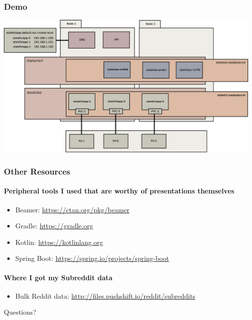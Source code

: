\documentclass{beamer}
\begin{document}
\begin{frame}
    \frametitle{Demo}
    \includegraphics[width=\textwidth,height=\textheight,keepaspectratio]{graphics/08-loadBalancer.eps}
\end{frame}

\begin{frame}
\frametitle{Other Resources}
\paragraph{Peripheral tools I used that are worthy of presentations themselves}
\begin{itemize}
    \item Beamer: \href{https://ctan.org/pkg/beamer}{https://ctan.org/pkg/beamer}
    \item Gradle: \href{https://gradle.org}{https://gradle.org}
    \item Kotlin: \href{https://kotlinlang.org}{https://kotlinlang.org}
    \item Spring Boot: \href{https://spring.io/projects/spring-boot}{https://spring.io/projects/spring-boot}
\end{itemize}
\paragraph{Where I got my Subreddit data}
\begin{itemize}
    \item Bulk Reddit data: \href{http://files.pushshift.io/reddit/subreddits}{http://files.pushshift.io/reddit/subreddits}
\end{itemize}
\end{frame}

\begin{frame}
    \begin{center}
        \Huge Questions?
    \end{center}
\end{frame}
\end{document}
